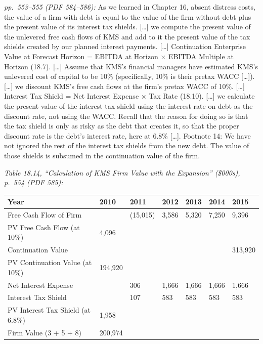 \documentclass[11pt,a4paper]{article}
\begin{document}
\emph{pp.~553--555 (PDF 584--586):} As we learned in Chapter 16, absent distress costs, the value of
a firm with debt is equal to the value of the firm without debt plus the present value of its
interest tax shields. {[}\ldots{]} we compute the present value of the unlevered free cash flows of
KMS and add to it the present value of the tax shields created by our planned interest payments.
{[}\ldots{]} Continuation Enterprise Value at Forecast Horizon = EBITDA at Horizon × EBITDA Multiple
at Horizon (18.7). {[}\ldots{]} Assume that KMS's financial managers have estimated KMS's unlevered
cost of capital to be 10\% (specifically, 10\% is their pretax WACC {[}\ldots{]}). {[}\ldots{]} we
discount KMS's free cash flows at the firm's pretax WACC of 10\%. {[}\ldots{]} Interest Tax Shield =
Net Interest Expense × Tax Rate (18.10). {[}\ldots{]} we calculate the present value of the interest
tax shield using the interest rate on debt as the discount rate, not using the WACC. Recall that the
reason for doing so is that the tax shield is only as risky as the debt that creates it, so that the
proper discount rate is the debt's interest rate, here at 6.8\% {[}\ldots{]}. Footnote 14: We have
not ignored the rest of the interest tax shields from the new debt. The value of those shields is
subsumed in the continuation value of the firm.

\emph{Table 18.14, ``Calculation of KMS Firm Value with the Expansion'' (\$000s), p.~554 (PDF 585):}

{\def\LTcaptype{none} %
\begin{longtable}[]{@{}lllllll@{}}
\toprule\noalign{}
Year & 2010 & 2011 & 2012 & 2013 & 2014 & 2015 \\
\midrule\noalign{}
\endhead
\bottomrule\noalign{}
\endlastfoot
Free Cash Flow of Firm & & (15,015) & 3,586 & 5,320 & 7,250 & 9,396 \\
PV Free Cash Flow (at 10\%) & 4,096 & & & & & \\
Continuation Value & & & & & & 313,920 \\
PV Continuation Value (at 10\%) & 194,920 & & & & & \\
Net Interest Expense & & 306 & 1,666 & 1,666 & 1,666 & 1,666 \\
Interest Tax Shield & & 107 & 583 & 583 & 583 & 583 \\
PV Interest Tax Shield (at 6.8\%) & 1,958 & & & & & \\
Firm Value (3 + 5 + 8) & 200,974 & & & & & \\
\end{longtable}
}
\end{document}
